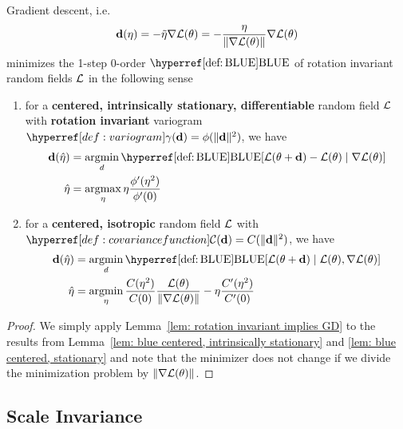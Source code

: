 \begin{theorem}\label{thm: bayesian descent}
	Gradient descent, i.e. 
	\begin{equation*}
		\mathbf{d}(\eta) = - \tilde{\eta} \nabla\mathcal{L}(\theta)
		= - \frac{\eta}{\|\nabla\mathcal{L}(\theta)\|} \nabla\mathcal{L}(\theta)
	\end{equation*}
	minimizes the 1-step 0-order \(\BLUE\) of rotation invariant random fields
	\(\mathcal{L}\) in the following sense
	\begin{enumerate}
		\item for a \textbf{centered, intrinsically stationary, differentiable}
		random field \(\mathcal{L}\) with \textbf{rotation invariant} variogram
		\(\variogram(\step) = \phi(\|\step\|^2)\), we have
		\begin{align*}
			\step(\hat{\lr})
			&= \argmin_{d}
			\BLUE[\Loss(\param + \step) - \Loss(\param)\mid \grad\Loss(\param)]\\
			\hat{\lr}
			&= \argmax_{\lr} \lr\frac{\phi'(\lr^2)}{\phi'(0)}
		\end{align*}


		\item for a \textbf{centered, isotropic} random field \(\mathcal{L}\) with
		\(\C(\step)=C(\|\step\|^2)\), we have
		\begin{align*}
			\step(\hat{\lr})
			&= \argmin_{d}
			\BLUE[\Loss(\param + \step)\mid \Loss(\param), \grad\Loss(\param)]\\
			\hat{\lr}
			&= \argmin_{\lr}\frac{\sqC(\lr^2)}{\sqC(0)} \frac{\Loss(\param)}{\|\grad\Loss(\param)\|}
			-  \lr\frac{\sqC'(\lr^2)}{\sqC'(0)}
		\end{align*}
	\end{enumerate}
\end{theorem}

\begin{proof}
	We simply apply Lemma~\ref{lem: rotation invariant implies GD}	to the results
	from Lemma~\ref{lem: blue centered, intrinsically stationary} and \ref{lem:
	blue centered, stationary} and note that the minimizer does not change if
	we divide the minimization problem by \(\|\nabla\mathcal{L}(\theta)\|\).
\end{proof}

\subsection{Scale Invariance}

